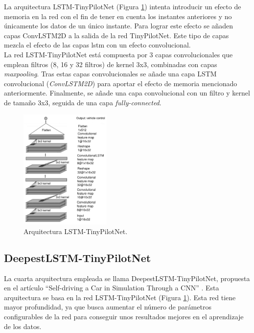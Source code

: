 La arquitectura LSTM-TinyPilotNet (Figura \ref{fig.Lstm_TinyPilotNet}) intenta introducir un efecto de memoria en la red con el fin de tener en cuenta los instantes anteriores y no únicamente los datos de un único instante. Para lograr este efecto se añaden capas ConvLSTM2D a la salida de la red TinyPilotNet. Este tipo de capas mezcla el efecto de las capas \acrshort{lstm} con un efecto convolucional.  \\

La red LSTM-TinyPilotNet está compuesta por 3 capas convolucionales que emplean filtros (8, 16 y 32 filtros) de kernel 3x3, combinadas con capas \textit{maxpooling}. Tras estas capas convolucionales se añade una capa LSTM convolucional (\textit{ConvLSTM2D}) para aportar el efecto de memoria mencionado anteriormente. Finalmente, se añade una capa convolucional con un filtro y kernel de tamaño 3x3, seguida de una capa \textit{fully-connected}.\\

\begin{figure}
\begin{center}
	\includegraphics[width=0.4\textwidth]{figures/Regresion/lstm_tinypilotnet.png}
   \caption{Arquitectura LSTM-TinyPilotNet.}
	\label{fig.Lstm_TinyPilotNet}
\end{center}
\end{figure}


\subsection{DeepestLSTM-TinyPilotNet}\label{deeplstm}

La cuarta arquitectura empleada se llama DeepestLSTM-TinyPilotNet, propuesta en el artículo ``Self-driving a Car in Simulation Through a CNN'' \cite{self-driving}. Esta arquitectura se basa en la red LSTM-TinyPilotNet (Figura \ref{fig.Lstm_TinyPilotNet}). Esta red tiene mayor profundidad, ya que busca aumentar el número de parámetros configurables de la red para conseguir unos resultados mejores en el aprendizaje de los datos.\\

